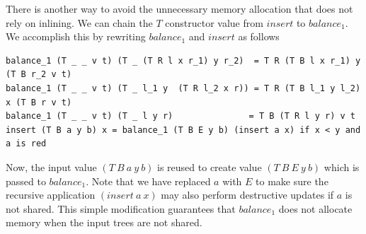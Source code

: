 There is another way to avoid the unnecessary memory allocation that does not rely on inlining.
We can chain the $T$ constructor value from $\textit{insert}$ to $\textit{balance}_1$.
We accomplish this by rewriting $\textit{balance}_1$ and $\textit{insert}$ as follows
\begin{lstlisting}
balance_1 (T _ _ v t) (T _ (T R l x r_1) y r_2)  = T R (T B l x r_1) y (T B r_2 v t)
balance_1 (T _ _ v t) (T _ l_1 y  (T R l_2 x r)) = T R (T B l_1 y l_2) x (T B r v t)
balance_1 (T _ _ v t) (T _ l y r)               = T B (T R l y r) v t
insert (T B a y b) x = balance_1 (T B E y b) (insert a x) if x < y and a is red
\end{lstlisting}
Now, the input value $(T\ B\ a\ y\ b)$ is reused to create value $(T\ B\ E\ y\ b)$ which is passed to $\textit{balance}_1$. Note that
we have replaced $a$ with $E$ to make sure the recursive application $(\textit{insert}\ a\ x)$
may also perform destructive updates if $a$ is not shared.
This simple modification guarantees that $\textit{balance}_1$ does not allocate memory when
the input trees are not shared.

